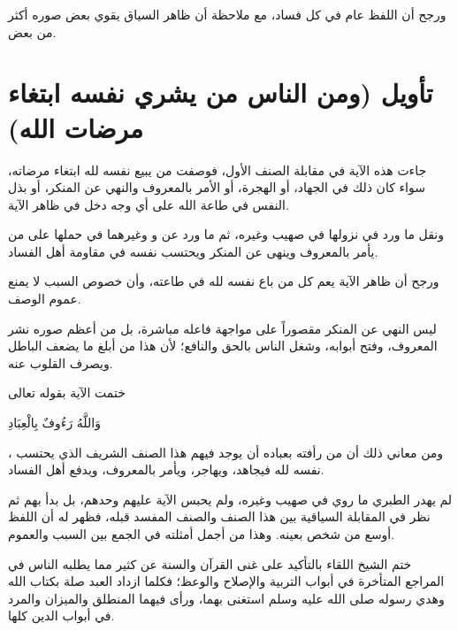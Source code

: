 ورجح أن اللفظ عام في كل فساد، مع ملاحظة أن ظاهر السياق يقوي بعض صوره أكثر من بعض.

\section{تأويل (ومن الناس من يشري نفسه ابتغاء مرضات الله)}
جاءت هذه الآية في مقابلة الصنف الأول، فوصفت من يبيع نفسه لله ابتغاء مرضاته، سواء كان ذلك في الجهاد، أو الهجرة، أو الأمر بالمعروف والنهي عن المنكر، أو بذل النفس في طاعة الله على أي وجه دخل في ظاهر الآية.

ونقل  ما ورد في نزولها في صهيب وغيره، ثم ما ورد عن  و وغيرهما في حملها على من يأمر بالمعروف وينهى عن المنكر ويحتسب نفسه في مقاومة أهل الفساد.

ورجح أن ظاهر الآية يعم كل من باع نفسه لله في طاعته، وأن خصوص السبب لا يمنع عموم الوصف.

\begin{fawaid}
ليس النهي عن المنكر مقصوراً على مواجهة فاعله مباشرة، بل من أعظم صوره نشر المعروف، وفتح أبوابه، وشغل الناس بالحق والنافع؛ لأن هذا من أبلغ ما يضعف الباطل ويصرف القلوب عنه.
\end{fawaid}

\begin{fawaid}
ختمت الآية بقوله تعالى \begin{ayah}وَاللَّهُ رَءُوفٌ بِالْعِبَادِ\end{ayah}، ومن معاني ذلك أن من رأفته بعباده أن يوجد فيهم هذا الصنف الشريف الذي يحتسب نفسه لله فيجاهد، ويهاجر، ويأمر بالمعروف، ويدفع أهل الفساد.
\end{fawaid}

\begin{fawaid}
لم يهدر الطبري ما روي في صهيب وغيره، ولم يحبس الآية عليهم وحدهم، بل بدأ بهم ثم نظر في المقابلة السياقية بين هذا الصنف والصنف المفسد قبله، فظهر له أن اللفظ أوسع من شخص بعينه. وهذا من أجمل أمثلته في الجمع بين السبب والعموم.
\end{fawaid}

\separator

ختم الشيخ اللقاء بالتأكيد على غنى القرآن والسنة عن كثير مما يطلبه الناس في المراجع المتأخرة في أبواب التربية والإصلاح والوعظ؛ فكلما ازداد العبد صلة بكتاب الله وهدي رسوله صلى الله عليه وسلم استغنى بهما، ورأى فيهما المنطلق والميزان والمرد في أبواب الدين كلها.
